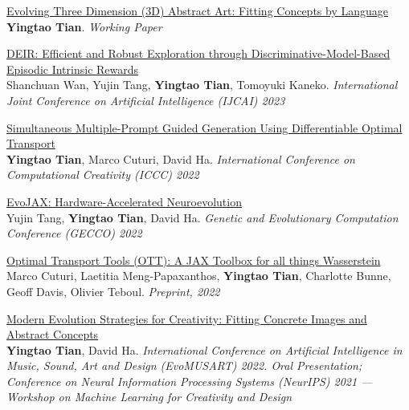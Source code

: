 \documentclass[line,margin]{cv}
\begin{document}
\begin{resume}
{  \begin{samepage}
  \href{https://arxiv.org/abs/2304.12932}{Evolving Three Dimension (3D) Abstract Art: Fitting Concepts by Language}\\
  \textbf{Yingtao Tian}. \emph{Working Paper}
  \par\end{samepage}

  \begin{samepage}
  \href{https://arxiv.org/abs/2304.10770}{DEIR: Efficient and Robust Exploration through Discriminative-Model-Based Episodic Intrinsic Rewards}\\
  Shanchuan Wan, Yujin Tang, \textbf{Yingtao Tian}, Tomoyuki Kaneko. \emph{International Joint Conference on Artificial Intelligence (IJCAI) 2023}
  \par\end{samepage}

  \begin{samepage}
  \href{https://arxiv.org/abs/2204.08472}{Simultaneous Multiple-Prompt Guided Generation Using Differentiable Optimal Transport}\\
  \textbf{Yingtao Tian}, Marco Cuturi, David Ha. \emph{International Conference on Computational Creativity (ICCC) 2022}
  \par\end{samepage}

  \begin{samepage}
  \href{https://arxiv.org/abs/2202.05008}{EvoJAX: Hardware-Accelerated Neuroevolution}\\
  Yujin Tang, \textbf{Yingtao Tian}, David Ha. \emph{Genetic and Evolutionary Computation Conference (GECCO) 2022}
  \par\end{samepage}

  \begin{samepage}
  \href{https://arxiv.org/abs/2201.12324}{Optimal Transport Tools (OTT): A JAX Toolbox for all things Wasserstein}\\
  Marco Cuturi, Laetitia Meng-Papaxanthos, \textbf{Yingtao Tian}, Charlotte Bunne, Geoff Davis, Olivier Teboul. \emph{Preprint, 2022}
  \par\end{samepage}

  \begin{samepage}
  \href{https://arxiv.org/abs/2109.08857}{Modern Evolution Strategies for Creativity: Fitting Concrete Images and Abstract Concepts}\\
  \textbf{Yingtao Tian}, David Ha. \emph{International Conference on Artificial Intelligence in Music, Sound, Art and Design (EvoMUSART) 2022. Oral Presentation; Conference on Neural Information Processing Systems (NeurIPS) 2021 --- Workshop on Machine Learning for Creativity and Design}
  \par\end{samepage}

}
\end{resume}
\end{document}
